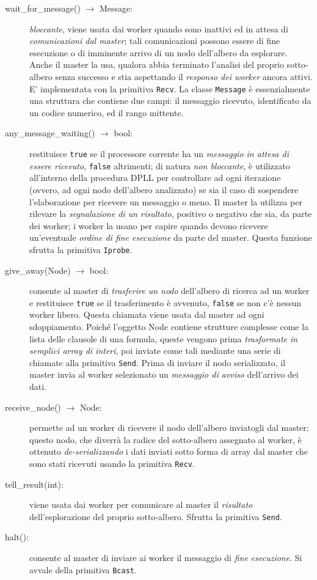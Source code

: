 \documentclass[12pt, a4paper, twosides]{report}
\begin{document}
\begin{description}
\item[wait\_for\_message() $\rightarrow$ Message:] \textit{bloccante}, viene usata dai worker quando sono inattivi ed in attesa di \textit{comunicazioni dal master}; tali comunicazioni possono essere di fine esecuzione o di imminente arrivo di un nodo dell'albero da esplorare. Anche il master la usa, qualora abbia terminato l'analisi del proprio sotto-albero senza successo e stia aspettando il \textit{responso dei worker} ancora attivi. E' implementata con la primitiva \verb|Recv|. La classe \verb|Message| è essenzialmente una struttura che contiene due campi: il messaggio ricevuto, identificato da un codice numerico, ed il rango mittente.

\item[any\_message\_waiting() $\rightarrow$ bool:] restituisce \verb|true| se il processore corrente ha un \textit{messaggio in attesa di essere ricevuto}, \verb|false| altrimenti; di natura \textit{non bloccante}, è utilizzato all'interno della procedura DPLL per controllare ad ogni iterazione (ovvero, ad ogni nodo dell'albero analizzato) se sia il caso di sospendere l'elaborazione per ricevere un messaggio o meno. Il master la utilizza per rilevare la \textit{segnalazione di un risultato}, positivo o negativo che sia, da parte dei worker; i worker la usano per capire quando devono ricevere un'eventuale \textit{ordine di fine esecuzione} da parte del master. Questa funzione sfrutta la primitiva \verb|Iprobe|.

\item[give\_away(Node) $\rightarrow$ bool:] consente al master di \textit{trasferire un nodo} dell'albero di ricerca ad un worker e restituisce \verb|true| se il trasferimento è avvenuto, \verb|false| se non c'è nessun worker libero. Questa chiamata viene usata dal master ad ogni sdoppiamento. Poiché l'oggetto Node contiene strutture complesse come la lista delle clausole di una formula, queste vengono prima \textit{trasformate in semplici array di interi}, poi inviate come tali mediante una serie di chiamate alla primitiva \verb|Send|. Prima di inviare il nodo serializzato, il master invia al worker selezionato un \textit{messaggio di avviso} dell'arrivo dei dati.

\item[receive\_node() $\rightarrow$ Node:] permette ad un worker di ricevere il nodo dell'albero inviatogli dal master; questo nodo, che diverrà la radice del sotto-albero assegnato al worker, è ottenuto \textit{de-serializzando} i dati inviati sotto forma di array dal master che sono stati ricevuti usando la primitiva \verb|Recv|.

\item[tell\_result(int):] viene usata dai worker per comunicare al master il \textit{risultato} dell'esplorazione del proprio sotto-albero. Sfrutta la primitiva \verb|Send|.

\item[halt():] consente al master di inviare ai worker il messaggio di \textit{fine esecuzione}. Si avvale della primitiva \verb|Bcast|.
\end{description}
\end{document}
